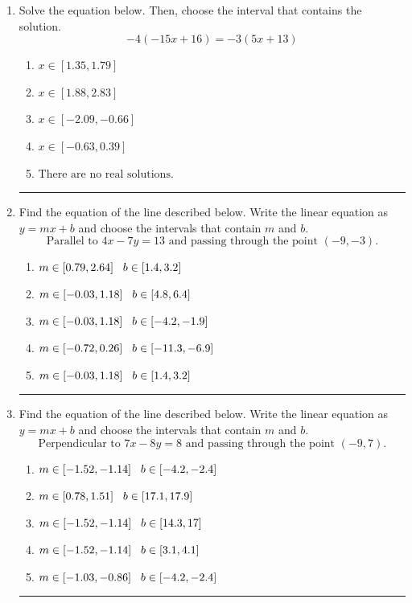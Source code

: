 \documentclass[14pt]{extbook}
\newcommand{\litem}[1]{\item#1\hspace*{-1cm}\rule{\textwidth}{0.4pt}}
\begin{document}
\begin{enumerate}
{\begin{enumerate}[label=\Alph*.]
\end{enumerate} }
\litem{
Solve the equation below. Then, choose the interval that contains the solution.\[ -4(-15x + 16) = -3(5x + 13) \]\begin{enumerate}[label=\Alph*.]
\item \( x \in [1.35, 1.79] \)
\item \( x \in [1.88, 2.83] \)
\item \( x \in [-2.09, -0.66] \)
\item \( x \in [-0.63, 0.39] \)
\item \( \text{There are no real solutions.} \)

\end{enumerate} }
\litem{
Find the equation of the line described below. Write the linear equation as $ y=mx+b $ and choose the intervals that contain $m$ and $b$.\[ \text{Parallel to } 4 x - 7 y = 13 \text{ and passing through the point } (-9, -3). \]\begin{enumerate}[label=\Alph*.]
\item \( m \in [0.79, 2.64] \hspace*{3mm} b \in [1.4, 3.2] \)
\item \( m \in [-0.03, 1.18] \hspace*{3mm} b \in [4.8, 6.4] \)
\item \( m \in [-0.03, 1.18] \hspace*{3mm} b \in [-4.2, -1.9] \)
\item \( m \in [-0.72, 0.26] \hspace*{3mm} b \in [-11.3, -6.9] \)
\item \( m \in [-0.03, 1.18] \hspace*{3mm} b \in [1.4, 3.2] \)

\end{enumerate} }
\litem{
Find the equation of the line described below. Write the linear equation as $ y=mx+b $ and choose the intervals that contain $m$ and $b$.\[ \text{Perpendicular to } 7 x - 8 y = 8 \text{ and passing through the point } (-9, 7). \]\begin{enumerate}[label=\Alph*.]
\item \( m \in [-1.52, -1.14] \hspace*{3mm} b \in [-4.2, -2.4] \)
\item \( m \in [0.78, 1.51] \hspace*{3mm} b \in [17.1, 17.9] \)
\item \( m \in [-1.52, -1.14] \hspace*{3mm} b \in [14.3, 17] \)
\item \( m \in [-1.52, -1.14] \hspace*{3mm} b \in [3.1, 4.1] \)
\item \( m \in [-1.03, -0.86] \hspace*{3mm} b \in [-4.2, -2.4] \)


\end{enumerate}}
\end{enumerate}
\end{document}
